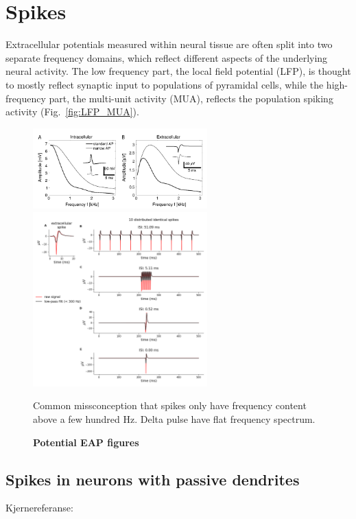 \section{Spikes}

Extracellular potentials measured within neural tissue are often split into two separate frequency domains, which reflect different aspects of the underlying neural activity. The low frequency part, the local field potential (LFP), is thought to mostly reflect synaptic input to populations of pyramidal cells, while the high-frequency part, the multi-unit activity (MUA), reflects the population spiking activity (Fig.~\ref{fig:LFP_MUA}).
\begin{figure}[!ht]
\begin{center}
\includegraphics[width=0.6\textwidth]{Figures/eap_illustration.png}
\includegraphics[width=0.6\textwidth]{Figures/LFP_spike_effect_test_300Hz.png}
\end{center}
\caption{\textbf{Potential EAP figures} 
} Common missconception that spikes only have frequency content above a few hundred Hz. Delta pulse have flat frequency spectrum.
\label{fig:freq_dep}
\end{figure}

\subsection{Spikes in neurons with passive dendrites} 
Kjernereferanse: \citep{Pettersen2008a}

